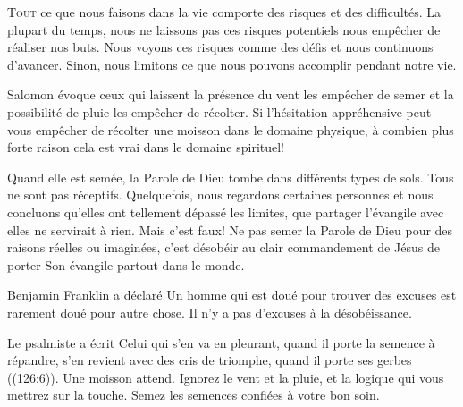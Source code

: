 \lettrine{T}{out} ce que nous faisons dans la vie
 comporte des risques et des difficultés.
 La plupart du temps, nous ne laissons pas ces risques potentiels
 nous empêcher de réaliser nos buts.
 Nous voyons ces risques comme des défis et nous continuons d'avancer.
 Sinon, nous limitons ce que nous pouvons accomplir pendant notre vie. 

Salomon évoque ceux qui laissent la présence du vent les empêcher
 de semer et la possibilité de pluie les empêcher de récolter.
 Si l'hésitation appréhensive peut vous empêcher de récolter
 une moisson dans le domaine physique, à combien plus forte raison
 cela est vrai dans le domaine spirituel! 

Quand elle est semée, la Parole de Dieu tombe dans différents types de sols.
 Tous ne sont pas réceptifs.
 Quelquefois, nous regardons certaines personnes et nous concluons
 qu'elles ont tellement dépassé les limites, que partager l'évangile 
 avec elles ne servirait à rien. Mais c'est faux!
 Ne pas semer la Parole de Dieu pour des raisons réelles ou imaginées,
 c'est désobéir au clair commandement de Jésus de porter Son évangile 
 partout dans le monde. 

Benjamin Franklin a déclaré\frcolon{} 
 \Og Un homme qui est doué pour trouver des excuses est rarement doué
 pour autre chose. \Fg{} Il n'y a pas d'excuses à la désobéissance. 


Le psalmiste a écrit\frcolon{} 
 \Og Celui qui s'en va en pleurant, quand il porte la semence à répandre,
 s'en revient avec des cris de triomphe, quand il porte ses gerbes \Fg{} 
 ((126:6)). Une moisson attend. Ignorez le vent et la pluie,
 et la logique qui vous mettrez sur la touche.
 Semez les semences confiées à votre bon soin.

\dvrule






